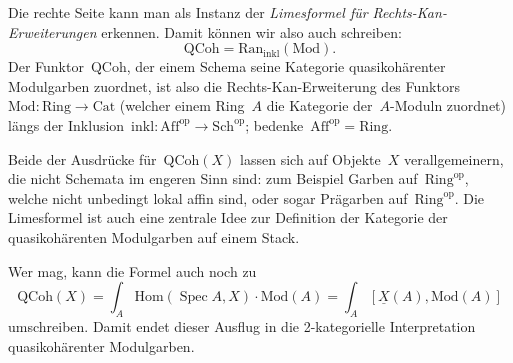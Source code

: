 \documentclass[a4paper,ngerman,12pt]{scrartcl}
\theoremstyle{definition}
\theoremstyle{plain}
\theoremstyle{remark}
\newcommand{\op}{\mathrm{op}}
\newcommand{\Hom}{\mathrm{Hom}}
\newcommand{\ul}[1]{\underline{#1}}
\DeclareMathOperator{\Spec}{Spec}
\begin{document}
Die rechte Seite kann man als Instanz der \emph{Limesformel für
Rechts-Kan-Erweiterungen} erkennen. Damit können wir also auch schreiben:
\[ \mathrm{QCoh} = \mathrm{Ran}_\mathrm{inkl}(\mathrm{Mod}). \]
Der Funktor~$\mathrm{QCoh}$, der einem Schema seine Kategorie quasikohärenter
Modulgarben zuordnet, ist also die Rechts-Kan-Erweiterung des
Funktors~$\mathrm{Mod} : \mathrm{Ring} \to \mathrm{Cat}$ (welcher einem
Ring~$A$ die Kategorie der~$A$-Moduln zuordnet) längs der
Inklusion~$\mathrm{inkl} : \mathrm{Aff}^\op \to \mathrm{Sch}^\op$;
bedenke~$\mathrm{Aff}^\op = \mathrm{Ring}$.

Beide der Ausdrücke für~$\mathrm{QCoh}(X)$ lassen sich auf Objekte~$X$
verallgemeinern, die nicht Schemata im engeren Sinn sind: zum Beispiel Garben
auf~$\mathrm{Ring}^\op$, welche nicht unbedingt lokal affin sind, oder sogar
Prägarben auf~$\mathrm{Ring}^\op$. Die Limesformel ist auch eine zentrale Idee
zur Definition der Kategorie der quasikohärenten Modulgarben auf einem Stack.

Wer mag, kann die Formel auch noch zu
\[ \mathrm{QCoh}(X) = \int_A \Hom(\Spec A, X) \cdot \mathrm{Mod}(A) =
  \int_A [\ul{X}(A), \mathrm{Mod}(A)] \]
umschreiben. Damit endet dieser Ausflug in die 2-kategorielle Interpretation
quasikohärenter Modulgarben.
\end{document}
